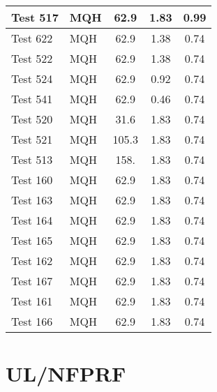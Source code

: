 \begin{table}[!ht]
\begin{center}
\begin{tabular}{|l|l|c|c|c|}
Test 517   &  MQH               &  62.9           &  1.83        &  0.99        \\ \hline
Test 622   &  MQH               &  62.9           &  1.38        &  0.74        \\ \hline
Test 522   &  MQH               &  62.9           &  1.38        &  0.74        \\ \hline
Test 524   &  MQH               &  62.9           &  0.92        &  0.74        \\ \hline
Test 541   &  MQH               &  62.9           &  0.46        &  0.74        \\ \hline
Test 520   &  MQH               &  31.6           &  1.83        &  0.74        \\ \hline
Test 521   &  MQH               &  105.3          &  1.83        &  0.74        \\ \hline
Test 513   &  MQH               &  158.           &  1.83        &  0.74        \\ \hline
Test 160   &  MQH               &  62.9           &  1.83        &  0.74        \\ \hline
Test 163   &  MQH               &  62.9           &  1.83        &  0.74        \\ \hline
Test 164   &  MQH               &  62.9           &  1.83        &  0.74        \\ \hline
Test 165   &  MQH               &  62.9           &  1.83        &  0.74        \\ \hline
Test 162   &  MQH               &  62.9           &  1.83        &  0.74        \\ \hline
Test 167   &  MQH               &  62.9           &  1.83        &  0.74        \\ \hline
Test 161   &  MQH               &  62.9           &  1.83        &  0.74        \\ \hline
Test 166   &  MQH               &  62.9           &  1.83        &  0.74        \\ \hline
\end{tabular}
\end{center}
\end{table}


\clearpage


\section{UL/NFPRF}


